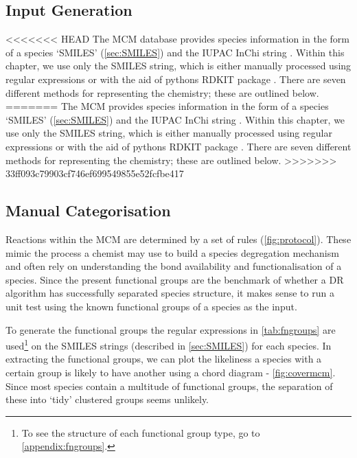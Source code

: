 \subsection{Input Generation}
<<<<<<< HEAD
The MCM database provides species information in the form of a species `SMILES' (\autoref{sec:SMILES}) and the IUPAC InChi string \citep{inchi}. Within this chapter, we use only the SMILES string, which is either manually processed using regular expressions or with the aid of pythons RDKIT package \citep{rdkit}. There are seven different methods for representing the chemistry; these are outlined below.
=======
The MCM provides species information in the form of a species `SMILES' (\autoref{sec:SMILES}) and the IUPAC InChi string \citep{inchi}. Within this chapter, we use only the SMILES string, which is either manually processed using regular expressions or with the aid of pythons RDKIT package \citep{rdkit}. There are seven different methods for representing the chemistry; these are outlined below.
>>>>>>> 33ff093c79903cf746ef699549855e52fcfbe417


\subsection{Manual Categorisation}
Reactions within the MCM are determined by a set of rules (\autoref{fig:protocol}). These mimic the process a chemist may use to build a species degregation mechanism and often rely on understanding the bond availability and functionalisation of a species. Since the present functional groups are the benchmark of whether a DR algorithm has successfully separated species structure, it makes sense to run a unit test using the known functional groups of a species as the input.

To generate the functional groups the regular expressions in \autoref{tab:fngroups} are used\footnote{To see the structure of each functional group type, go to \autoref{appendix:fngroups}.} on the SMILES strings (described in \autoref{sec:SMILES}) for each species. In extracting the functional groups, we can plot the likeliness a species with a certain group is likely to have another using a chord diagram - \autoref{fig:covermcm}. Since most species contain a multitude of functional groups, the separation of these into `tidy' clustered groups seems unlikely.


%



